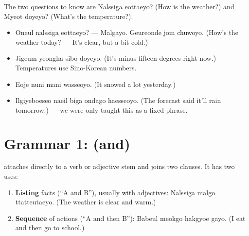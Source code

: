 \begin{example}
The two questions to know are  Nalssiga eottaeyo? (How is the
weather?) and  Myeot doyeyo? (What's the temperature?).
\begin{itemize}
  \item {} Oneul nalssiga eottaeyo?
        --- Malgayo. Geureonde jom chuwoyo. (How's the weather today? --- It's clear, but
        a bit cold.)
  \item {} Jigeum yeongha sibo doyeyo. (It's minus fifteen
        degrees right now.) Temperatures use Sino-Korean numbers.
  \item {} Eoje nuni mani wasseoyo. (It snowed a lot
        yesterday.)
  \item {} Ilgiyeboeseo naeil biga ondago
        haesseoyo. (The forecast said it'll rain tomorrow.) --- we were only taught this
        as a fixed phrase.
\end{itemize}
\end{example}

\section{Grammar 1:  (and)}

 attaches directly to a verb or adjective stem and joins two clauses. It has
two uses:
\begin{enumerate}
  \item \textbf{Listing} facts (``A and B''), usually with adjectives:
         Nalssiga malgo ttatteutaeyo. (The weather is clear and
        warm.)
  \item \textbf{Sequence} of actions (``A and then B''):
         Babeul meokgo hakgyoe gayo. (I eat and then go to
        school.)
\end{enumerate}

\begin{center}
\end{center}

